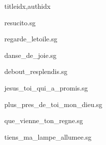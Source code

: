 \documentclass[12pt]{article}
\begin{document}
\begin{songs}{titleidx,authidx}

{resucito.sg}


{regarde_letoile.sg}


{danse_de_joie.sg}


{debout_resplendis.sg}


{jesus_toi_qui_a_promis.sg}


{plus_pres_de_toi_mon_dieu.sg}


{que_vienne_ton_regne.sg}


{tiens_ma_lampe_allumee.sg}



\end{songs}
\end{document}
